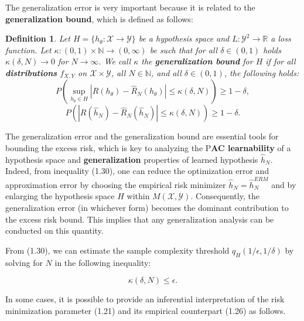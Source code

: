 \documentclass{report}
\newtheorem{definition}{Definition}[chapter]
\begin{document}
The generalization error is very important because it is related to the \textbf{generalization bound}, which is defined as follows:

\begin{definition}
Let $H = \{h_\theta : \mathcal{X} \to \mathcal{Y}\}$ be a hypothesis space and $L:\mathcal{Y}^2 \to \mathbb{R}$ a loss function. Let $\kappa : (0,1) \times \mathbb{N} \to (0,\infty)$ be such that for all $\delta \in (0,1)$ holds $\kappa(\delta, N) \to 0$ for $N \to \infty$. We call $\kappa$ the \textbf{generalization bound} for $H$ if for all \textbf{distributions} $f_{X,Y}$ on $\mathcal{X} \times \mathcal{Y}$, all $N \in \mathbb{N}$, and all $\delta \in (0,1)$, the following holds:
\begin{equation}
P\left(\sup_{h_{\theta} \in H}|R(h_\theta)-\hat{R}_N(h_\theta)|\leq \kappa(\delta, N)\right) \geq 1-\delta,
\end{equation}
\begin{equation}
P\left(|R(\hat{h}_N)-\hat{R}_N(\hat{h}_N)|\leq \kappa(\delta, N)\right) \geq 1-\delta.
\end{equation}
\end{definition}

The generalization error and the generalization bound are essential tools for bounding the excess risk, which is key to analyzing the P\textbf{AC learnability} of a hypothesis space and \textbf{generalization} properties of learned hypothesis $\hat{h}_N$. Indeed, from inequality (1.30), one can reduce the optimization error and approximation error by choosing the empirical risk minimizer $\hat{h}_N = \hat{h}^{ERM}_N$ and by enlarging the hypothesis space $H$ within $M(\mathcal{X}, \mathcal{Y})$. Consequently, the generalization error (in whichever form) becomes the dominant contribution to the excess risk bound. This implies that any generalization analysis can be conducted on this quantity.

From (1.30), we can estimate the sample complexity threshold $q_H(1/\epsilon, 1/\delta)$ by solving for $N$ in the following inequality:

\begin{equation}
\kappa(\delta,N) \leq \epsilon.
\end{equation}

In some cases, it is possible to provide an inferential interpretation of the risk minimization parameter (1.21) and its empirical counterpart (1.26) as follows.
\end{document}
